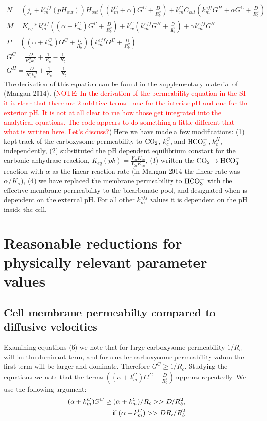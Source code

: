 \documentclass[]{article}
\begin{document}
\begin{eqnarray}
N = (j_c+k_m^{eff}(pH_{out}))H_{out}((k_m^C+\alpha)G^C+\frac{D}{R_b^2}) + k_m^C C_{out} (k_m^{eff} G^H +\alpha G^C+\frac{D}{R_b^2}) \\
M = K_{eq}*k_m^{eff}\left((\alpha+ k_m^C)G^C +  \frac{D}{R_b^2}\right)
+ k_m^C\left(k_m^{eff} G^H + \frac{D}{R_b^2}\right) + \alpha k_m^{eff} G^H \\
P = ((\alpha + k_m^C)G^C+\frac{D}{R_b^2})(k_m^{eff} G^H + \frac{D}{R_b^2}) \\
G^C = \frac{D}{R_c^2 k_c^C} + \frac{1}{R_c}-\frac{1}{R_b} \\
G^H = \frac{D}{R_c^2 k_c^H} + \frac{1}{R_c}-\frac{1}{R_b} 
\end{eqnarray}
The derivation of this equation can be found in the supplementary material of (Mangan 2014). (\textcolor{red}{NOTE: In the derivation of the permeability equation in the SI it is clear that there are 2 additive terms - one for the interior pH and one for the exterior pH. It is not at all clear to me how those get integrated into the analytical equations. The code appears to do something a little different that what is written here. Let's discuss?}) Here we have made a few modifications: (1) kept track of the carboxysome permeability to ${\rm CO_2}$, $k_c^C$, and ${\rm HCO_3^-}$, $k_c^H$, independently, (2) substituted the pH dependent equilibrium constant for the carbonic anhydrase reaction, $K_{eq}(ph) = \frac{V_{ca} K_{ba}}{V_{ba}K_{ca}}$, (3) written the ${\rm CO_2} \rightarrow {\rm HCO_3^-}$ reaction with $\alpha$ as the linear reaction rate (in Mangan 2014 the linear rate was $\alpha/K_\alpha$), (4) we have replaced the membrane permeability to ${\rm HCO_3^-}$ with the effective membrane permeability to the bicarbonate pool, and designated when is dependent on the external pH. For all other $k_m^{eff}$ values it is dependent on the pH inside the cell.



\section{Reasonable reductions for physically relevant parameter values}
\subsection{Cell membrane permeabilty compared to diffusive velocities}
Examining equations (6) we note that for large carboxysome permeability $1/R_c$ will be the dominant term, and for smaller carboxysome permeability values the first term will be larger and dominate. Therefore $G^C \geq 1/R_c$. Studying the equations we note that the terms $((\alpha + k_m^C)G^C+\frac{D}{R_b^2})$ appears repeatedly. We use the following argument:
\begin{eqnarray}
(\alpha + k_m^C)G^C \geq (\alpha + k_m^C)/R_c>>D/R_b^2, \\
\; {\rm if} \; (\alpha +k_m^C)>> D R_c/R_b^2
\end{eqnarray}
\end{document}
